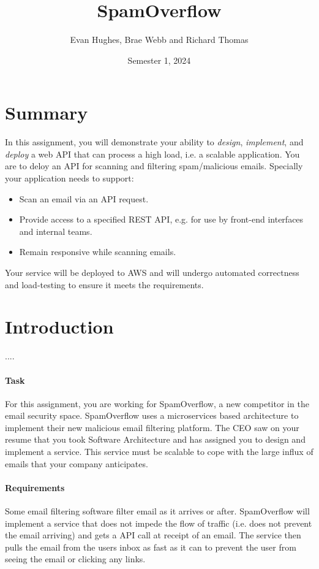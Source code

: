 \documentclass{csse4400}
\title{SpamOverflow}
\author{Evan Hughes, Brae Webb and Richard Thomas}
\date{Semester 1, 2024}
\begin{document}

\maketitle


\section*{Summary}
In this assignment, you will demonstrate your ability to \textsl{design},
\textsl{implement}, and \textsl{deploy} a web API that can process a high load,
i.e. a scalable application.
You are to deloy an API for scanning and filtering spam/malicious emails.
Specially your application needs to support:
\begin{itemize}
    \item Scan an email via an API request.
    \item Provide access to a specified REST API, e.g. for use by front-end interfaces and internal teams.
    \item Remain responsive while scanning emails.
\end{itemize}

Your service will be deployed to AWS and will undergo automated correctness and load-testing to ensure it meets the requirements.

\section{Introduction}
....

\paragraph{Task}
For this assignment, you are working for SpamOverflow, a new competitor in the email security space. SpamOverflow uses a microservices based architecture to implement their new malicious email filtering platform. The CEO saw on your resume that you took Software Architecture and has assigned you to design and implement a service. This service must be scalable to cope with the large influx of emails that your company anticipates.

\paragraph{Requirements}
Some email filtering software filter email as it arrives or after. SpamOverflow will implement a service that does not impede the flow of traffic (i.e. does not prevent the email arriving) and gets a API call at receipt of an email. The service then pulls the email from the users inbox as fast as it can to prevent the user from seeing the email or clicking any links.
\end{document}
